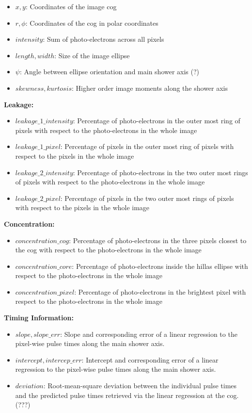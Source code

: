 \begin{itemize}
    \item{$x, y$: Coordinates of the image cog}
    \item{$r, \phi$: Coordinates of the cog in polar coordinates}
    \item{$intensity$: Sum of photo-electrons across all pixels}
    \item{$length, width$: Size of the image ellipse}
    \item{$\psi$: Angle between ellipse orientation and main shower axis (?)}
    \item{$skewness, kurtosis$: Higher order image moments along the shower axis}
\end{itemize}

\textbf{Leakage:}

\begin{itemize}
    \item{$leakage\_1\_intensity$: Percentage of photo-electrons in the outer most ring of pixels with respect to the photo-electrons in the whole image}
    \item{$leakage\_1\_pixel$: Percentage of pixels in the outer most ring of pixels with respect to the pixels in the whole image}
    \item{$leakage\_2\_intensity$: Percentage of photo-electrons in the two outer most rings of pixels with respect to the photo-electrons in the whole image}
    \item{$leakage\_2\_pixel$: Percentage of pixels in the two outer most rings of pixels with respect to the pixels in the whole image}
\end{itemize}

\textbf{Concentration:}

\begin{itemize}
    \item{$concentration\_cog$: Percentage of photo-electrons in the three pixels closest to the cog with respect to the photo-electrons in the whole image}
    \item{$concentration\_core$: Percentage of photo-electrons inside the hillas ellipse with respect to the photo-electrons in the whole image}
    \item{$concentration\_pixel$: Percentage of photo-electrons in the brightest pixel with respect to the photo-electrons in the whole image}
\end{itemize}

\textbf{Timing Information:}

\begin{itemize}
    \item{$slope, slope\_err$: Slope and corresponding  error of a linear regression to the pixel-wise pulse times along the main shower axis.}
    \item{$intercept, intercep\_err$: Intercept and corresponding  error of a linear regression to the pixel-wise pulse times along the main shower axis.}
    \item{$deviation$: Root-mean-square deviation between the individual pulse times and the predicted pulse times
        retrieved via the linear regression at the cog. (???)}
\end{itemize}

